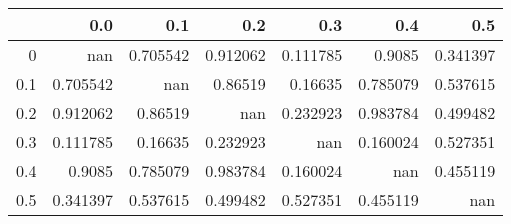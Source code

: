 \begin{tabular}{rrrrrrr}
\toprule
     &        0.0 &        0.1 &        0.2 &        0.3 &        0.4 &        0.5 \\
\midrule
 0   & nan        &   0.705542 &   0.912062 &   0.111785 &   0.9085   &   0.341397 \\
 0.1 &   0.705542 & nan        &   0.86519  &   0.16635  &   0.785079 &   0.537615 \\
 0.2 &   0.912062 &   0.86519  & nan        &   0.232923 &   0.983784 &   0.499482 \\
 0.3 &   0.111785 &   0.16635  &   0.232923 & nan        &   0.160024 &   0.527351 \\
 0.4 &   0.9085   &   0.785079 &   0.983784 &   0.160024 & nan        &   0.455119 \\
 0.5 &   0.341397 &   0.537615 &   0.499482 &   0.527351 &   0.455119 & nan        \\
\bottomrule
\end{tabular}